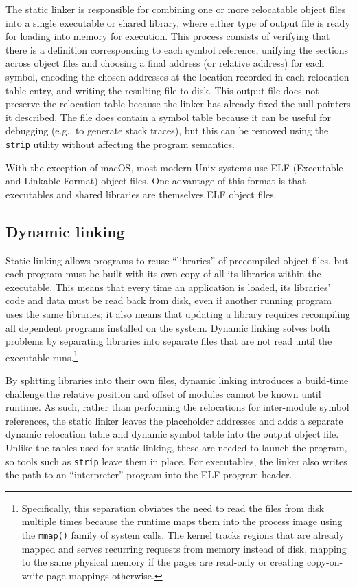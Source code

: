 The static linker is responsible for combining one or more relocatable object files
into a single executable or shared library, where either type of output file is
ready for loading into memory for execution.  This process consists of verifying that
there is a definition corresponding to each symbol reference, unifying the sections
across object files and choosing a final address (or relative address) for each
symbol, encoding the chosen addresses at the location recorded in each relocation
table entry, and writing the resulting file to disk.  This output file does not
preserve the relocation table because the linker has already fixed the null pointers
it described.  The file does contain a symbol table because it can be useful for
debugging (e.g., to generate stack traces), but this can be removed using the
\texttt{strip} utility without affecting the program semantics.

With the exception of macOS, most modern Unix systems use ELF (Executable and
Linkable Format) object files.  One advantage of this format is that executables and
shared libraries are themselves ELF object files.


\subsection{Dynamic linking}
\label{sec:libgotcha:dylink}

Static linking allows programs to reuse ``libraries'' of precompiled object files,
but each program must be built with its own copy of all its libraries within the
executable.  This means that every time an application is loaded, its libraries' code
and data must be read back from disk, even if another running program uses the same
libraries; it also means that updating a library requires recompiling all dependent
programs installed on the system.  Dynamic linking solves both problems by separating
libraries into separate files that are not read until the executable runs.\footnote{
Specifically, this separation obviates the need to read the files from disk multiple
times because the runtime maps them into the process image using the \texttt{mmap()}
family of system calls.  The kernel tracks regions that are already mapped and serves
recurring requests from memory instead of disk, mapping to the same physical memory
if the pages are read-only or creating copy-on-write page mappings otherwise.}

By splitting libraries into their own files, dynamic linking introduces a build-time
challenge:\@ the relative position and offset of modules cannot be known until
runtime.  As such, rather than performing the relocations for inter-module symbol
references, the static linker leaves the placeholder addresses and adds a separate
dynamic relocation table and dynamic symbol table into the output object file.
Unlike the tables used for static linking, these are needed to launch the program, so
tools such as \texttt{strip} leave them in place.  For executables, the linker also
writes the path to an ``interpreter'' program into the ELF program header.

